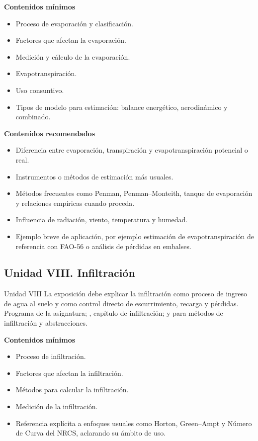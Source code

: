 \documentclass[11pt]{article}
\begin{document}
\textbf{Contenidos mínimos}
\begin{itemize}
\item Proceso de evaporación y clasificación.
\item Factores que afectan la evaporación.
\item Medición y cálculo de la evaporación.
\item Evapotranspiración.
\item Uso consuntivo.
\item Tipos de modelo para estimación: balance energético, aerodinámico y combinado.
\end{itemize}

\textbf{Contenidos recomendados}
\begin{itemize}
\item Diferencia entre evaporación, transpiración y evapotranspiración potencial o real.
\item Instrumentos o métodos de estimación más usuales.
\item Métodos frecuentes como Penman, Penman--Monteith, tanque de evaporación y relaciones empíricas cuando proceda.
\item Influencia de radiación, viento, temperatura y humedad.
\item Ejemplo breve de aplicación, por ejemplo estimación de evapotranspiración de referencia con FAO-56 o análisis de pérdidas en embalses.
\end{itemize}

\subsection{Unidad VIII. Infiltración}
\unitbox
{Unidad VIII}
{La exposición debe explicar la infiltración como proceso de ingreso de agua al suelo y como control directo de escurrimiento, recarga y pérdidas.}
{Programa de la asignatura; \textcite{aparicio1989}, capítulo de infiltración; \textcite{chow1994} y \textcite{mays2011} para métodos de infiltración y abstracciones.}

\textbf{Contenidos mínimos}
\begin{itemize}
\item Proceso de infiltración.
\item Factores que afectan la infiltración.
\item Métodos para calcular la infiltración.
\item Medición de la infiltración.
\item Referencia explícita a enfoques usuales como Horton, Green--Ampt y Número de Curva del NRCS, aclarando su ámbito de uso.
\end{itemize}
\end{document}
